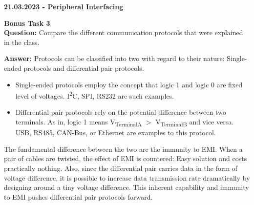 \documentclass[12pt,a4paper]{letter}
\begin{document}
	\textbf{21.03.2023 - Peripheral Interfacing}

	\textbf{Bonus Task 3}\\

	\textbf{Question:} Compare the different communication protocols that were explained in the class.

	\textbf{Answer:} Protocols can be classified into two with regard to their nature: Single-ended protocols and differential pair protocols.

	\begin{itemize}
		\item Single-ended protocols employ the concept that logic 1 and logic 0 are fixed level of voltages. I\textsuperscript{2}C, SPI, RS232 are such examples.

		\item Differential pair protocols rely on the potential difference between two terminals. As in, logic 1 means V\textsubscript{TerminalA} $>$ V\textsubscript{TerminalB} and vice versa. USB, RS485, CAN-Bus, or Ethernet are examples to this protocol.
	\end{itemize}

	The fundamental difference between the two are the immunity to EMI. When a pair of cables are twisted, the effect of EMI is countered: Easy solution and costs practically nothing. Also, since the differential pair carries data in the form of voltage difference, it is possible to increase data transmission rate dramatically by designing around a tiny voltage difference. This inherent capability and immunity to EMI pushes differential pair protocols forward.
\end{document}
